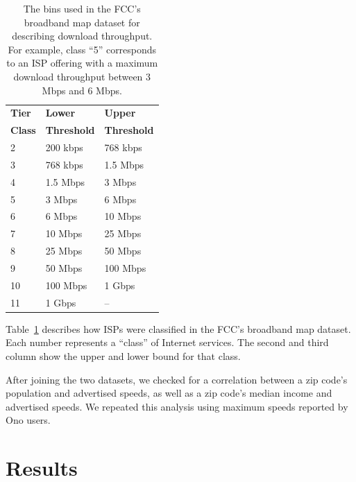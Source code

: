 \documentclass{sig-alternate-10pt}
\begin{document}
\begin{table}
    \centering
    \small
    \begin{tabular}{ | l | l | l |}
    \hline
    \textbf{Tier} & \textbf{Lower} & \textbf{Upper} \\
    \textbf{Class} & \textbf{Threshold} & \textbf{Threshold} \\ \hline
    2 & 200 kbps & 768 kbps \\ \hline
    3 & 768 kbps & 1.5 Mbps \\ \hline
    4 & 1.5 Mbps & 3 Mbps \\ \hline
    5 & 3 Mbps & 6 Mbps \\ \hline
    6 & 6 Mbps & 10 Mbps \\ \hline
    7 & 10 Mbps & 25 Mbps \\ \hline
    8 & 25 Mbps & 50 Mbps \\ \hline
    9 & 50 Mbps & 100 Mbps\\ \hline
    10 & 100 Mbps & 1 Gbps\\ \hline
    11 & 1 Gbps & -- \\ \hline
    \end{tabular}
\caption{The bins used in the FCC's broadband map dataset 
for describing download throughput.
For example, class ``5'' corresponds to an ISP offering 
with a maximum download throughput between 3 Mbps and
6 Mbps.}
\label{table:service-classes}
\end{table}

Table~\ref{table:service-classes} describes how ISPs were classified in the 
FCC's broadband map dataset. Each number represents a ``class'' of Internet
services. The second and third column show the upper and lower bound for 
that class.

After joining the two datasets, we checked for a correlation between a zip
code's population and advertised speeds, as well as a zip code's median income
and advertised speeds.  We repeated this analysis using maximum speeds reported
by Ono users.

\section{Results}
\label{sec:results} 
\end{document}
